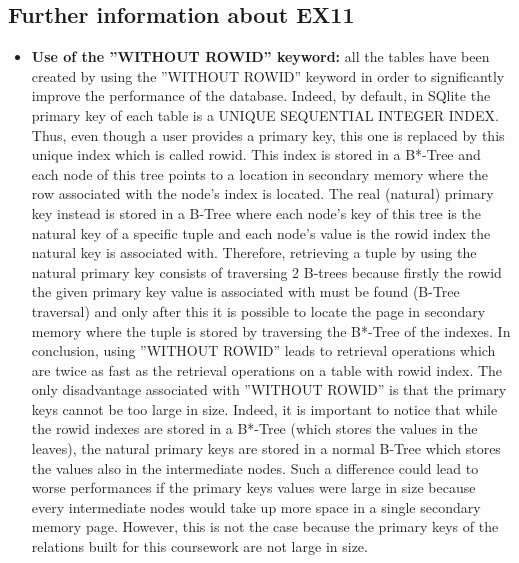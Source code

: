 \documentclass{article}
\begin{document}
\subsection{Further information about EX11} \label{EX11}
\begin{itemize}
    \item 
\textbf{Use of the ”WITHOUT ROWID” keyword:} all the tables have been created by using the ”WITHOUT ROWID” keyword in order to significantly improve the performance of the database. Indeed, by
default, in SQlite the primary key of each table is a UNIQUE SEQUENTIAL INTEGER INDEX. Thus,
even though a user provides a primary key, this one is replaced by this unique index which is called rowid.
This index is stored in a B*-Tree and each node of this tree points to a location in secondary memory where the row
associated with the node's index is located. The real (natural) primary key instead is stored in a B-Tree where
each node's key of this tree is the natural key of a specific tuple and each node’s value is the rowid index the natural key
is associated with. Therefore, retrieving a tuple by using the natural primary key consists of traversing
2 B-trees because firstly the rowid the given primary key value is associated with must be found (B-Tree
traversal) and only after this it is possible to locate the page in secondary memory where the tuple is stored  by traversing the B*-Tree of the indexes. In conclusion, using ”WITHOUT ROWID” leads to retrieval operations which are twice
as fast as the retrieval operations on a table with rowid index. The only disadvantage associated with
”WITHOUT ROWID” is that the primary keys cannot be too large in size. Indeed, it is important to
notice that while the rowid indexes are stored in a B*-Tree (which stores the values in the leaves), the
natural primary keys are stored in a normal B-Tree which stores the values also in the intermediate nodes.
Such a difference could lead to worse performances if the primary keys values were large in size because
every intermediate nodes would take up more space in a single secondary memory page. However, this is
not the case because the primary keys of the relations built for this coursework are not large in size.


\end{itemize}
\end{document}

